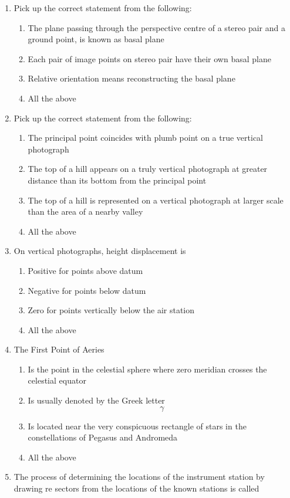 \documentclass[11pt,a4paper]{article}
\begin{document}
\begin{enumerate}
\item{Pick up the correct statement from the following:}
\begin{enumerate}[label=\Alph*.]
\item{The plane passing through the perspective centre of a stereo pair and a ground point, is known as basal plane}
\item{Each pair of image points on stereo pair have their own basal plane}
\item{Relative orientation means reconstructing the basal plane}
\item{All the above}
\end{enumerate}
\item{Pick up the correct statement from the following:}
\begin{enumerate}[label=\Alph*.]
\item{The principal point coincides with plumb point on a true vertical photograph}
\item{The top of a hill appears on a truly vertical photograph at greater distance than its bottom from the principal point}
\item{The top of a hill is represented on a vertical photograph at larger scale than the area of a nearby valley}
\item{All the above}
\end{enumerate}
\item{On vertical photographs, height displacement is}
\begin{enumerate}[label=\Alph*.]
\item{Positive for points above datum}
\item{Negative for points below datum}
\item{Zero for points vertically below the air station}
\item{All the above}
\end{enumerate}
\item{The First Point of Aeries}
\begin{enumerate}[label=\Alph*.]
\item{Is the point in the celestial sphere where zero meridian crosses the celestial equator}
\item{Is usually denoted by the Greek letter $$\gamma $$}
\item{Is located near the very conspicuous rectangle of stars in the constellations of Pegasus and Andromeda}
\item{All the above}
\end{enumerate}
\item{The process of determining the locations of the instrument station by drawing re sectors from the locations of the known stations is called}

\end{enumerate}
\end{document}
